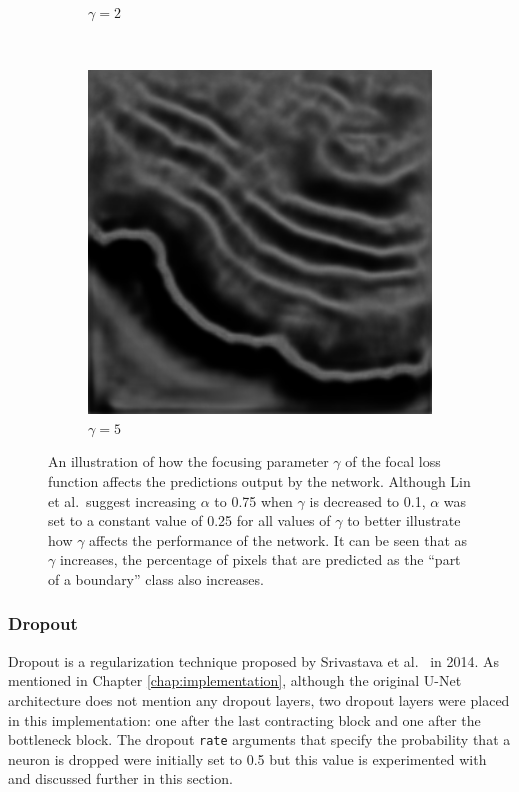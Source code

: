 \begin{figure}[t]
\begin{subfigure}[t]{0.32\textwidth}
        \caption{$\gamma=2$}
    \end{subfigure}
    ~
    \begin{subfigure}[t]{0.32\textwidth}
        \centering
        \includegraphics[width=1\textwidth, valign=c]{images/focal_g5.png}
        \caption{$\gamma=5$}
    \end{subfigure}
    \caption{An illustration of how the focusing parameter $\gamma$ of the focal loss function affects the predictions output by the network. Although Lin et al.\ suggest increasing $\alpha$ to 0.75 when $\gamma$ is decreased to 0.1, $\alpha$ was set to a constant value of 0.25 for all values of $\gamma$ to better illustrate how $\gamma$ affects the performance of the network. It can be seen that as $\gamma$ increases, the percentage of pixels that are predicted as the ``part of a boundary'' class also increases.}
    \label{fig:lossfunctiondiff}
\end{figure}

\subsubsection{Dropout}

Dropout is a regularization technique proposed by Srivastava et al.~\cite{dropout} in 2014. As mentioned in Chapter \ref{chap:implementation}, although the original U-Net architecture does not mention any dropout layers, two dropout layers were placed in this implementation: one after the last contracting block and one after the bottleneck block. The dropout \texttt{rate} arguments that specify the probability that a neuron is dropped were initially set to 0.5 but this value is experimented with and discussed further in this section.

